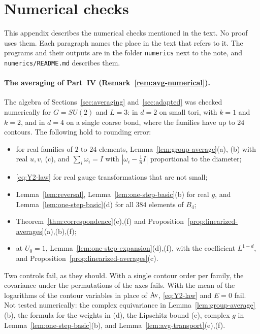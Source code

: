 \section{Numerical checks}\label{app:numerics}

This appendix describes the numerical checks mentioned in the text. No proof uses them. Each paragraph names the place in the text that refers to it. The programs and their outputs are in the folder \texttt{numerics} next to the note, and \texttt{numerics/README.md} describes them.

\paragraph{The averaging of Part~IV (Remark~\ref{rem:avg-numerical}).}
The algebra of Sections~\ref{sec:averaging} and~\ref{sec:adapted} was checked numerically for $G=SU(2)$ and $L=3$: in $d=2$ on small tori, with $k=1$ and $k=2$, and in $d=4$ on a single coarse bond, where the families have up to $24$ contours. The following hold to rounding error:
\begin{itemize}
\item for real families of $2$ to $24$ elements, Lemma~\ref{lem:group-average}(a), (b) with real $u,v$, (c), and $\sum_i\omega_i=I$ with $|\omega_i-\frac1nI|$ proportional to the diameter;
\item \eqref{eq:Y2-law} for real gauge transformations that are not small;
\item Lemma~\ref{lem:reversal}, Lemma~\ref{lem:one-step-basic}(b) for real $g$, and Lemma~\ref{lem:one-step-basic}(d) for all $384$ elements of $B_4$;
\item Theorem~\ref{thm:correspondence}(e),(f) and Proposition~\ref{prop:linearized-averages}(a),(b),(f);
\item at $U_0=1$, Lemma~\ref{lem:one-step-expansion}(d),(f), with the coefficient $L^{1-d}$, and Proposition~\ref{prop:linearized-averages}(c).
\end{itemize}
Two controls fail, as they should. With a single contour order per family, the covariance under the permutations of the axes fails. With the mean of the logarithms of the contour variables in place of $\operatorname{Av}$, \eqref{eq:Y2-law} and $E=0$ fail. Not tested numerically: the complex equivariance in Lemma~\ref{lem:group-average}(b), the formula for the weights in (d), the Lipschitz bound (e), complex $g$ in Lemma~\ref{lem:one-step-basic}(b), and Lemma~\ref{lem:avg-transport}(e),(f).

